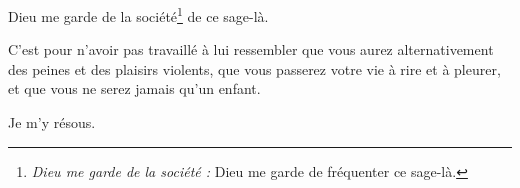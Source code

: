 {\vspace*{45pt}


Dieu me garde de la société\footnote{\emph{Dieu me garde de la société :} Dieu me garde de fréquenter ce sage-là.} de ce sage-là.


C’est pour n’avoir pas travaillé à lui ressembler que vous aurez alternativement des peines et des plaisirs violents, que vous passerez votre vie à rire et à pleurer, et que vous ne serez jamais qu’un enfant.


Je m’y résous.

}


